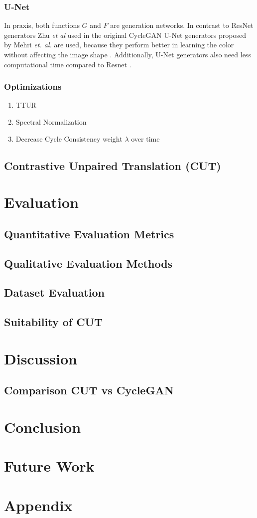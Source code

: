\documentclass[a4paper,11pt, DIV=12]{scrartcl}
\begin{document}
\subsubsection*{U-Net}
In praxis, both functions $G$ and $F$ are generation networks. In contrast to ResNet generators \cite{resnet} Zhu \textit{et al} used in the original CycleGAN \cite{cyclegan_orig}
U-Net generators \cite{unet} proposed by Mehri \textit{et. al.} are used, because they perform better in learning the color without affecting the image shape \cite{mehri2019colorizing}.
Additionally, U-Net generators also need less computational time compared to Resnet \cite{mehri2019colorizing}.

\subsubsection*{Optimizations}
\begin{enumerate}
   \item TTUR
   \item Spectral Normalization
   \item Decrease Cycle Consistency weight $\lambda$ over time 
\end{enumerate}


\subsection{Contrastive Unpaired Translation (CUT)}


\section{Evaluation}
\subsection{Quantitative Evaluation Metrics}
\subsection{Qualitative Evaluation Methods}
\subsection{Dataset Evaluation}
\subsection{Suitability of CUT}

\section{Discussion}
\subsection{Comparison CUT vs CycleGAN}

\section{Conclusion}
\section{Future Work}
\section{Appendix}

\printbibliography
\end{document}
